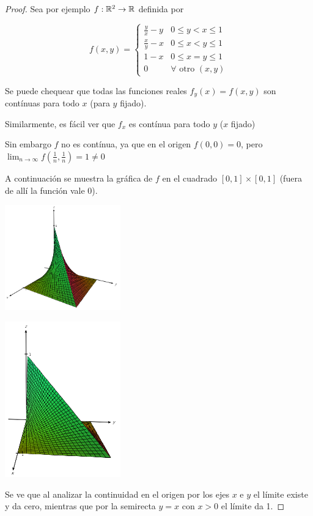 \begin{proof}
Sea por ejemplo $f: \mathbb{R}^2 \to \mathbb{R}$ definida por

$$f(x,y) = \begin{cases} 
\frac{y}{x} - y & 0 \leq y < x \leq 1 \\ 
\frac{x}{y} - x & 0 \leq x < y \leq 1 \\ 
1-x & 0 \leq x = y \leq 1 \\ 
0 & \forall \textrm{ otro } (x,y)  
\end{cases}$$

Se puede chequear que todas las funciones reales $f_y(x) = f(x,y)$ son contínuas para todo $x$ (para $y$ fijado).

Similarmente, es fácil ver que $f_x$ es contínua para todo $y$ ($x$ fijado)

Sin embargo $f$ no es contínua, ya que en el origen $f(0,0) = 0$, pero $\lim_{n \to \infty} f(\frac{1}{n}, \frac{1}{n}) = 1 \neq 0$

A continuación se muestra la gráfica de $f$ en el cuadrado $[0,1] \times [0,1]$ (fuera de allí la función vale 0).

\begin{center}
\includegraphics[width=5cm]{images/04_analisis2/func_discontinua1.png}

\includegraphics[width=5cm]{images/04_analisis2/func_discontinua2.png}
\end{center}

Se ve que al analizar la continuidad en el origen por los ejes $x$ e $y$ el límite existe y da cero, mientras que por la semirecta $y=x$ con $x >0$ el límite da 1.
\end{proof}

